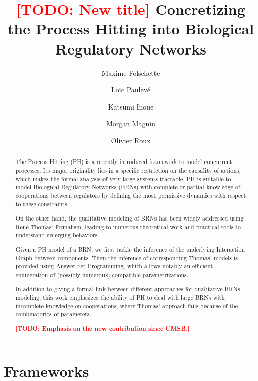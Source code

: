 \documentclass[preprint]{elsarticle}
\newcommand{\todo}[1]{\textcolor{red}{\textbf{[TODO: #1]}}}
\begin{document}
\begin{frontmatter}

\title{\todo{New title} Concretizing the Process Hitting into Biological Regulatory Networks}

\author[irccyn,nii]{Maxime Folschette}
\author[eth]{Lo\"ic Paulev\'e}
\author[nii]{Katsumi Inoue}
\author[irccyn,nii]{Morgan Magnin}
\author[irccyn]{Olivier Roux}

\address[irccyn]{LUNAM Universit\'e, \'Ecole Centrale de Nantes, IRCCyN UMR CNRS 6597\\
(Institut de Recherche en Communications et Cybern\'etique de Nantes)\\
1 rue de la No\"e - B.P. 92101 - 44321 Nantes Cedex 3, France.}
\address[nii]{National Institute of Informatics,\\
2-1-2, Hitotsubashi, Chiyoda-ku, Tokyo 101-8430, Japan.}
\address[eth]{ETH Zürich, Institut für Automatik,\\
ETL I 28, Physikstrasse 3, 8092 Zurich, Switzerland.}

\begin{abstract}
\parindent 0.5cm
The Process Hitting (PH) is a recently introduced framework to model concurrent processes.
Its major originality lies in a specific restriction on the causality of actions, which
makes the formal analysis of very large systems tractable.
PH is suitable to model Biological Regulatory Networks (BRNs) with complete or partial
knowledge of cooperations between regulators by defining the most permissive dynamics
with respect to these constraints.

On the other hand, the qualitative modeling of BRNs has been widely addressed using Ren\'e Thomas'
formalism, leading to numerous theoretical work and practical tools to understand emerging behaviors.

Given a PH model of a BRN, we first tackle the inference of the underlying Interaction Graph
between components.
Then the inference of corresponding Thomas' models is provided using Answer Set Programming,
which allows notably an efficient enumeration of (possibly numerous) compatible parametrizations.

In addition to giving a formal link between different approaches for qualitative BRNs modeling, 
this work emphasizes the ability of PH to deal with large BRNs with incomplete knowledge on
cooperations, where Thomas' approach fails because of the combinatorics of parameters.

\todo{Emphasis on the new contribution since CMSB.}
\end{abstract}

\end{frontmatter}





\section{Frameworks}\label{sec:frameworks}











%
\end{document}
